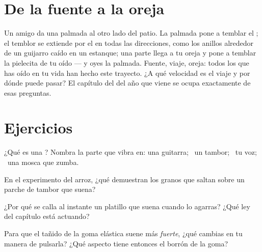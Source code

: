 \section{De la fuente a la oreja}

\begin{example}\label{ex:g3:sound-around-us:journey}
Un amigo da una palmada al otro lado del patio. La palmada pone a
temblar el ; el temblor se extiende por el  en todas las
direcciones, como los anillos alrededor de un guijarro caído en un
estanque; una parte llega a tu oreja y pone a temblar la pielecita de
tu oído --- y oyes la palmada. Fuente, viaje, oreja: todos los
 que has oído en tu vida han hecho este trayecto. ¿A qué
velocidad es el viaje y por dónde puede pasar? El capítulo del
 del año que viene se ocupa exactamente de esas preguntas.
\end{example}

\section{Ejercicios}

\begin{exercise}[$\star$]\label{exo:g3:sound-around-us:1}
¿Qué es una ? Nombra la parte que vibra en: una guitarra; \
un tambor; \ tu voz; \ una mosca que zumba.
\end{exercise}

\begin{exercise}[$\star$]\label{exo:g3:sound-around-us:2}
En el experimento del arroz, ¿qué demuestran los granos que saltan
sobre un parche de tambor que suena?
\end{exercise}

\begin{exercise}[$\star$]\label{exo:g3:sound-around-us:3}
¿Por qué se calla al instante un platillo que suena cuando lo agarras?
¿Qué ley del capítulo está actuando?
\end{exercise}

\begin{exercise}[$\star$]\label{exo:g3:sound-around-us:4}
Para que el tañido de la goma elástica suene más \emph{fuerte}, ¿qué
cambias en tu manera de pulsarla? ¿Qué aspecto tiene entonces el
borrón de la goma?
\end{exercise}

